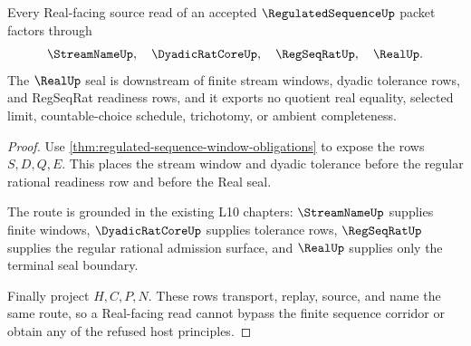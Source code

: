 \begin{theorem}
\label{thm:regulated-sequence-real-source-route}
Every Real-facing source read of an accepted $\RegulatedSequenceUp$ packet factors through
$$
\StreamNameUp,\quad \DyadicRatCoreUp,\quad \RegSeqRatUp,\quad \RealUp .
$$
The $\RealUp$ seal is downstream of finite stream windows, dyadic tolerance rows, and RegSeqRat readiness rows, and it exports no quotient real equality, selected limit, countable-choice schedule, trichotomy, or ambient completeness.
\end{theorem}
\begin{proof}
Use \autoref{thm:regulated-sequence-window-obligations} to expose the rows $S,D,Q,E$. This places the stream window and dyadic tolerance before the regular rational readiness row and before the Real seal.

The route is grounded in the existing L10 chapters: $\StreamNameUp$ supplies finite windows, $\DyadicRatCoreUp$ supplies tolerance rows, $\RegSeqRatUp$ supplies the regular rational admission surface, and $\RealUp$ supplies only the terminal seal boundary.

Finally project $H,C,P,N$. These rows transport, replay, source, and name the same route, so a Real-facing read cannot bypass the finite sequence corridor or obtain any of the refused host principles.
\end{proof}




